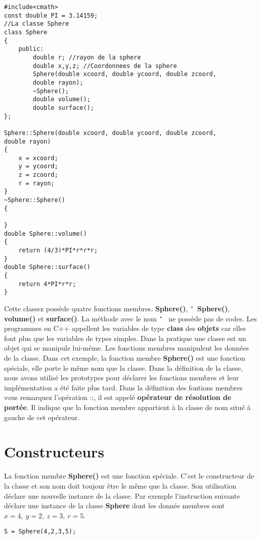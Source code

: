 \documentclass[a4paper, oneside,11pt]{book}
\begin{document}
\begin{lstlisting}
#include<cmath>
const double PI = 3.14159;
//La classe Sphere
class Sphere
{
    public:
        double r; //rayon de la sphere
        double x,y,z; //Coordonnees de la sphere
        Sphere(double xcoord, double ycoord, double zcoord, 
        double rayon);
        ~Sphere();
        double volume();
        double surface();
};

Sphere::Sphere(double xcoord, double ycoord, double zcoord, 
double rayon)
{
    x = xcoord;
    y = ycoord;
    z = zcoord;
    r = rayon;
}
~Sphere::Sphere()
{

}
double Sphere::volume()
{
    return (4/3)*PI*r*r*r;
}
double Sphere::surface()
{
    return 4*PI*r*r;
}
\end{lstlisting} 
Cette classez poss\` ede quatre fonctions membres. \textbf{Sphere()}, \texttt{\char`~}\textbf{Sphere()}, \textbf{volume()} et \textbf{surface()}. La m\'ethode avec le nom \texttt{\char`~} ne poss\`ede pas de codes. 
Les programmes en C++ appellent les variables de type \textbf{class} des \textbf{objets} car elles font plus que les
 variables de types simples. Dans la pratique une classe est un objet qui se manipule lui-m\^eme. Les fonctions
 membres manipulent les donn\'ees de la classe. Dans cet exemple, la fonction membre \textbf{Sphere()} est une fonction sp\'eciale, elle porte le m\^eme nom que la classe. Dans
 la d\'efinition de la classe, nous avons utilis\'e les prototypes pour d\'eclarer les fonctions membres et leur impl\'ementation a \'et\'e faite plus tard. Dans la d\'efinition
 des fontions membres vous remarquez l'op\'eration ::, il est appel\'e \textbf{op\'erateur de r\'esolution de port\'ee}. Il indique que la fonction membre appartient \`a la classe
 de nom situ\'e \`a gauche de cet op\'erateur. 
\section{Constructeurs}

La fonction membre \textbf{Sphere()} est une fonction sp\'eciale. C'est le constructeur de la classe et son nom doit toujour \^etre le m\^eme que la classe. Son utilisation 
d\'eclare une nouvelle instance de la classe. Par exemple l'instruction suivante d\'eclare une instance de la classe \textbf{Sphere} dont les donn\'ee membres sont
$x=4,\ y=2,\ z=3,\ r=5$.

\begin{lstlisting}
S = Sphere(4,2,3,5);
\end{lstlisting}
\end{document}
